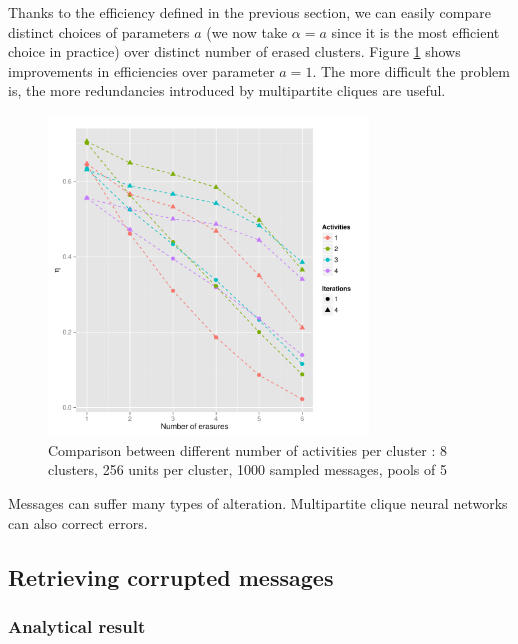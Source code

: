 \documentclass[english,10pt,twocolumn]{IEEEtran}
\theoremstyle{definition}
\begin{document}
		Thanks to the efficiency defined in the previous section, we can easily compare distinct choices of parameters $a$ (we now take $\alpha = a$ since it is the most efficient choice in practice) over distinct number of erased clusters. Figure \ref{comperth} shows improvements in efficiencies over parameter $a =1$. The more difficult the problem is, the more redundancies introduced by multipartite cliques are useful.
		
		\begin{figure}[!htb]
		\includegraphics[width=8.5cm]{Courbes/5portant_erasures_c8l256}
		\caption{Comparison between different number of activities per cluster :  8 clusters, 256 units per cluster, 1000 sampled messages, pools of 5}
		\label{comperth}
	\end{figure}
%	
	
	Messages can suffer many types of alteration. Multipartite clique neural networks can also correct errors.	
	
	\subsection{Retrieving corrupted messages}
	
	\subsubsection{Analytical result}
%	
%	
%	
%	
%	
	
\end{document}
